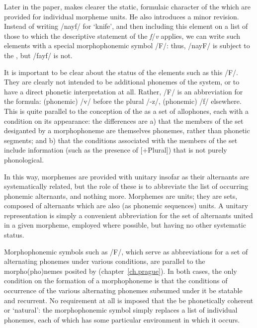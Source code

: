 Later in the paper, {\Harris} makes clearer the static, formulaic
character of the  which are provided for individual
morpheme units. He also introduces a minor revision. Instead of
writing /nayf/ for `knife', and then including this element on a list
of those to which the descriptive statement of the \emph{f}/\emph{v}
 applies, we can write such elements with a special
morphophonemic symbol /F/: thus, /nayF/ is subject to the ,
but /fayf/ is not.

It is important to be clear about the status of the elements such as
this /F/. They are clearly not intended to be additional phonemes of
the system, or to have a direct phonetic interpretation at
all. Rather, /F/ is an abbreviation for the formula: (phonemic) /v/
before the plural /-z/, (phonemic) /f/ elsewhere. This is quite
parallel to the conception of the  as a set of allophones, each
with a condition on its appearance: the differences are a) that the
members of the set desiganted by a morphophoneme are themselves
phonemes, rather than phonetic segments; and b) that the conditions
associated with the members of the set include information (such as
the presence of {[+Plural]}) that is not purely phonological.

In this way, morphemes are provided with unitary 
insofar as their alternants are systematically related, but the role
of these  is to abbreviate the list of occurring
phonemic alternants, and nothing more. Morphemes are units; they are
sets, composed of alternants which are also (as phonemic sequences)
units. A unitary representation is simply a convenient abbreviation
for the set of alternants united in a given morpheme, employed where
possible, but having no other systematic status.

Morphophonemic symbols such as /F/, which serve as abbreviations for a
set of alternating phonemes under various conditions, are parallel to
the morpho(pho)nemes posited by {\Trubetzkoy} (chapter~\ref{ch.prague}). In
both cases, the only condition on the formation of a morphophoneme is
that the conditions of occurrence of the various alternating phonemes
subsumed under it be statable and recurrent. No requirement at all is
imposed that the  be phonetically coherent or `natural':
the morphophonemic symbol simply replaces a list of individual
phonemes, each of which has some particular environment in which it
occurs.

